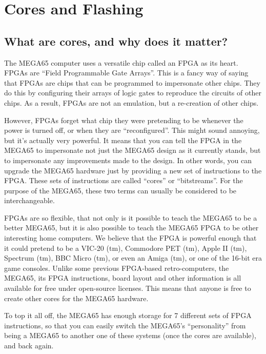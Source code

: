 \chapter{Cores and Flashing}
\label{cha:cores}

\section{What are cores, and why does it matter?}

The MEGA65 computer uses a versatile chip called an FPGA as its heart.
FPGAs are ``Field Programmable Gate Arrays''. This is a fancy way of
saying that FPGAs are chips that can be programmed to impersonate
other chips.  They do this by configuring their arrays of logic gates to
reproduce the circuits of other chips. As a result, FPGAs are not an emulation,
but a re-creation of other chips.

However, FPGAs forget what chip they were pretending
to be whenever the power is turned off, or when they are ``reconfigured''.
This might sound annoying, but it's actually very powerful. It means that
you can tell the FPGA in the MEGA65 to impersonate not just the MEGA65 design
as it currently stands, but to impersonate any improvements made to the design.
In other words, you can upgrade the MEGA65 hardware just by providing a new
set of instructions to the FPGA.  These sets of instructions are called ``cores''
or ``bitstreams''.  For the purpose of the MEGA65, these two terms can usually be
considered to be interchangeable.

FPGAs are so flexible, that not only is it possible to teach the MEGA65 to be a better
MEGA65, but it is also possible to teach the MEGA65 FPGA to be other interesting
home computers.  We believe that the FPGA is powerful enough that it could pretend to be
a VIC-20 (tm), Commodore PET (tm), Apple II (tm), Spectrum (tm), BBC Micro (tm), or even
an Amiga (tm), or one of the 16-bit era game consoles. Unlike some previous FPGA-based
retro-computers, the MEGA65, its FPGA instructions, board layout and other information is
all available for free under open-source licenses. This means that anyone is free to
create other cores for the MEGA65 hardware.

To top it all off, the MEGA65 has enough storage for 7 different sets of FPGA instructions,
so that you can easily switch the MEGA65's ``personality'' from being a MEGA65 to another one
of these systems (once the cores are available), and back again.

